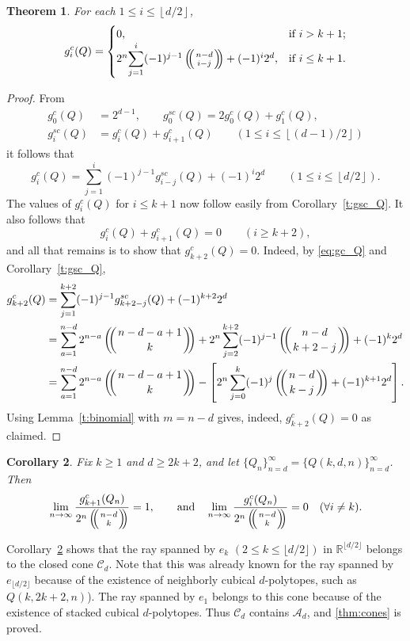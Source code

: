 \documentclass[a4paper,leqno]{article}
\newtheorem{theorem}{Theorem}%
\newtheorem{corollary}[theorem]{Corollary}
\theoremstyle{definition}
\newcommand{\gc}{g^c}
\newcommand{\gsc}{g^{sc}}
\newcommand{\dhalf}[1]{\left\lfloor #1/2\right\rfloor}
\newcommand{\R}{\mathbb{R}}
\def\mchoose#1#2{\ensuremath{\left(\kern-.3em\left(\genfrac{}{}{0pt}{}{#1}{#2}\right)\kern-.3em\right)}}
\begin{document}
\begin{theorem}\label{t:gc_Q}
For each $1 \leq i \leq \dhalf{d}$,
\[
\gc_i(Q)=\begin{cases}
0,& \text{if } i>k+1;\\
2^n {\displaystyle\sum_{j=1}^{i}} (-1)^{j-1} \mchoose{n-d}{i-j} + (-1)^i 2^d,& \text{if } i\leq k+1.
\end{cases}
\]
\end{theorem}
\begin{proof}
From
\[
\begin{aligned}
\gc_0(Q) &= 2^{d-1}, \qquad
\gsc_0(Q) = 2\gc_0(Q) + \gc_1(Q), \\
\gsc_i(Q) &= \gc_i(Q) + \gc_{i+1}(Q)
\qquad (1 \leq i \leq \dhalf{(d-1)})
\end{aligned}
\]
it follows that
\begin{equation}\label{eq:gc_Q}
\gc_i(Q) = \sum_{j=1}^{i} (-1)^{j-1} \gsc_{i-j}(Q) + (-1)^i 2^d
\qquad (1 \leq i \leq \dhalf{d}).
\end{equation}
The values of $\gc_i(Q)$ for $i \le k+1$ now follow easily from Corollary~\ref{t:gsc_Q}.
It also follows that
\[
\gc_i(Q) + \gc_{i+1}(Q) = 0 \qquad (i \ge k+2),
\]
and all that remains is to show that $\gc_{k+2}(Q) = 0$.
Indeed, by \eqref{eq:gc_Q} and Corollary~\ref{t:gsc_Q},
\[
\begin{aligned}
\gc_{k+2}(Q)
&= \sum_{j=1}^{k+2} (-1)^{j-1} \gsc_{k+2-j}(Q) + (-1)^{k+2} 2^d \\
&= \sum_{a=1}^{n-d} 2^{n-a} \mchoose{n-d-a+1}{k}
+ 2^n \sum_{j=2}^{k+2} (-1)^{j-1} \mchoose{n-d}{k+2-j} + (-1)^{k} 2^d \\
&= \sum_{a=1}^{n-d} 2^{n-a} \mchoose{n-d-a+1}{k}
- \left[ 2^n \sum_{j=0}^{k} (-1)^{j} \mchoose{n-d}{k-j} + (-1)^{k+1} 2^d \right].
\end{aligned}
\]
Using Lemma~\ref{t:binomial} with $m = n-d$ gives, indeed,
$\gc_{k+2}(Q) = 0$ as claimed.
\end{proof}

\begin{corollary}\label{t:asymptotics}
Fix $k \ge 1$ and $d \ge 2k+2$, and let $\{Q_n\}_{n=d}^{\infty}=\{Q(k,d,n)\}_{n=d}^{\infty}$.
Then
\[
\lim_{n \to \infty} \frac{\gc_{k+1}(Q_n)}{2^{n} \mchoose{n-d}{k}} = 1,
\qquad\text{and}\quad
\lim_{n \to \infty} \frac{\gc_i(Q_n)}{2^{n} \mchoose{n-d}{k}} = 0
\quad (\forall i \ne k).
\]
\end{corollary}

Corollary~\ref{t:asymptotics} shows that the ray spanned by $e_k$
$(2 \leq k \leq \lfloor d/2 \rfloor)$ in $\R^{\lfloor d/2 \rfloor}$ belongs to the closed cone $\mathcal{C}_d$.
Note that this was already known for the ray spanned by $e_{\lfloor d/2 \rfloor}$ because of the existence of neighborly cubical $d$-polytopes, such as $Q(k,2k+2,n)$).
The ray spanned by $e_1$ belongs to this cone because of the existence of stacked cubical $d$-polytopes.
Thus $\mathcal{C}_d$ contains $\mathcal{A}_d$, and \autoref{thm:cones} is proved.
\end{document}
